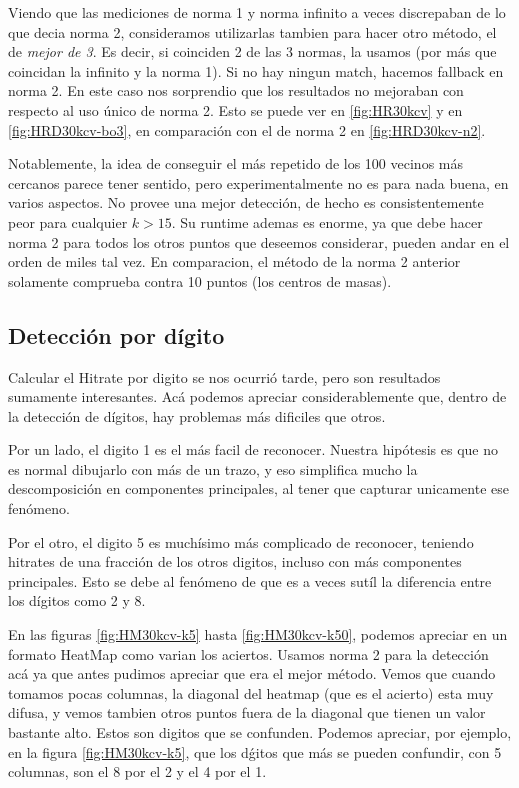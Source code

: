 Viendo que las mediciones de norma 1 y norma infinito a veces discrepaban de lo que
decia norma 2, consideramos utilizarlas tambien para hacer otro m\'etodo, el de \textit{mejor
de 3}. Es decir, si coinciden 2 de las 3 normas, la usamos (por m\'as que coincidan la
infinito y la norma 1). Si no hay ningun match, hacemos fallback en norma 2. En este caso
nos sorprendio que los resultados no mejoraban con respecto al uso \'unico de norma 2.
Esto se puede ver en \ref{fig:HR30kcv} y en \ref{fig:HRD30kcv-bo3}, en comparaci\'on con
el de norma 2 en \ref{fig:HRD30kcv-n2}.

Notablemente, la idea de conseguir el m\'as repetido de los 100 vecinos m\'as cercanos
parece tener sentido, pero experimentalmente no es para nada buena, en varios aspectos.
No provee una mejor detecci\'on, de hecho es consistentemente peor para cualquier $k>15$.
Su runtime ademas es enorme, ya que debe hacer norma 2 para todos los otros puntos que
deseemos considerar, pueden andar en el orden de miles tal vez. En comparacion, el m\'etodo
de la norma 2 anterior solamente comprueba contra 10 puntos (los centros de masas).


\subsection{Detecci\'on por d\'igito}
Calcular el Hitrate por digito se nos ocurri\'o tarde, pero son resultados
sumamente interesantes. Ac\'a podemos apreciar considerablemente que, dentro de
la detecci\'on de d\'igitos, hay problemas m\'as dificiles que otros.

Por un lado, el digito 1 es el m\'as facil de reconocer. Nuestra hip\'otesis
es que no es normal dibujarlo con m\'as de un trazo, y eso simplifica mucho la
descomposici\'on en componentes principales, al tener que capturar unicamente ese
fen\'omeno.

Por el otro, el digito 5 es much\'isimo m\'as complicado de reconocer, teniendo
hitrates de una fracci\'on de los otros digitos, incluso con m\'as componentes
principales. Esto se debe al fen\'omeno de que es a veces sut\'il la diferencia
entre los d\'igitos como 2 y 8.

En las figuras \ref{fig:HM30kcv-k5} hasta \ref{fig:HM30kcv-k50}, podemos apreciar
en un formato HeatMap como varian los aciertos. Usamos norma 2 para la detecci\'on ac\'a
ya que antes pudimos apreciar que era el mejor m\'etodo. Vemos que cuando tomamos pocas
columnas, la diagonal del heatmap (que es el acierto) esta muy difusa, y vemos tambien
otros puntos fuera de la diagonal que tienen un valor bastante alto. Estos son digitos
que se confunden. Podemos apreciar, por ejemplo, en la figura \ref{fig:HM30kcv-k5}, que
los d\'gitos que m\'as se pueden confundir, con 5 columnas, son el 8 por el 2 y el 4 por el 1.

